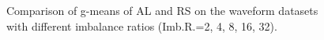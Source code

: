 \begin{figure}[b!]
    \caption{Comparison of g-means of AL and RS on the waveform datasets with different imbalance ratios (Imb.R.=2, 4, 8, 16, 32).}
    \label{fig:wfall}
\end{figure}
